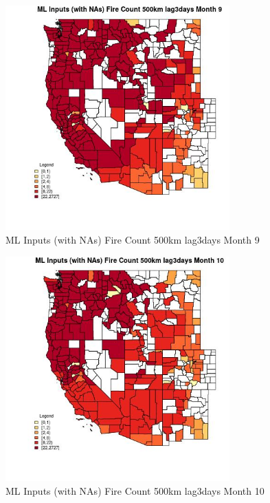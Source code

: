 \begin{figure} 
\centering  
\includegraphics[width=0.77\textwidth]{Code_Outputs/Report_ML_input_PM25_Step4_part_f_de_duplicated_aves_prioritize_24hr_obswNAs_CountyFire_Count_500km_lag3daysmedianMonth9.jpg} 
\caption{\label{fig:Report_ML_input_PM25_Step4_part_f_de_duplicated_aves_prioritize_24hr_obswNAsCountyFire_Count_500km_lag3daysmedianMonth9}ML Inputs (with NAs) Fire Count 500km lag3days Month 9} 
\end{figure} 
 

\begin{figure} 
\centering  
\includegraphics[width=0.77\textwidth]{Code_Outputs/Report_ML_input_PM25_Step4_part_f_de_duplicated_aves_prioritize_24hr_obswNAs_CountyFire_Count_500km_lag3daysmedianMonth10.jpg} 
\caption{\label{fig:Report_ML_input_PM25_Step4_part_f_de_duplicated_aves_prioritize_24hr_obswNAsCountyFire_Count_500km_lag3daysmedianMonth10}ML Inputs (with NAs) Fire Count 500km lag3days Month 10} 
\end{figure} 
 

